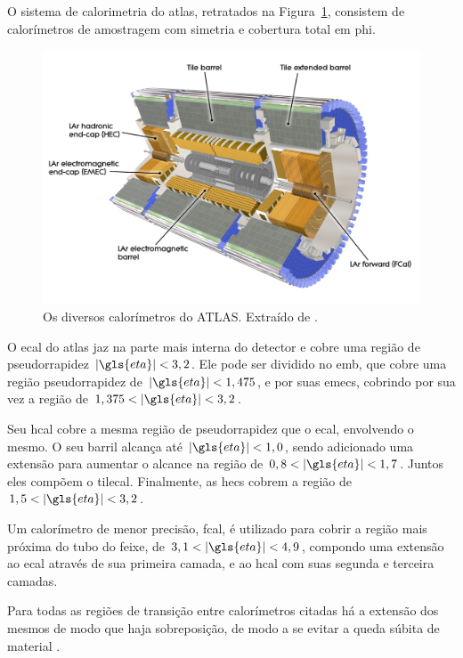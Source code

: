 O sistema de calorimetria \cite{cal_tdr,ecal_tdr,hcal_tdr} do \gls{atlas}, retratados na
Figura~\ref{fig:cal_atlas}, consistem de calorímetros de amostragem com 
simetria e cobertura total em \gls{phi}.

\begin{figure}[h!t]
\centering
\includegraphics[width=\textwidth]{imagens/calorimetros.pdf}
\caption[Os diversos subsistemas de calorimetria do ATLAS]{
Os diversos calorímetros do ATLAS. Extraído de
\cite{atlas_calorimeter_photo}.}
\label{fig:cal_atlas}
\end{figure}

O \gls{ecal} do \gls{atlas} jaz na parte mais interna do detector e cobre uma região de 
pseudorrapidez $|\gls{eta}|<3,2$. Ele pode ser dividido no
\gls{emb}, que cobre uma região pseudorrapidez de $|\gls{eta}|<1,475$, 
e por suas \glspl{emec}, cobrindo por sua vez a região de $1,375<|\gls{eta}|<3,2$.

Seu \gls{hcal} cobre a mesma região de pseudorrapidez que o \gls{ecal}, envolvendo
o mesmo. O seu barril alcança até $|\gls{eta}|<1,0$, sendo adicionado uma
extensão para aumentar o alcance na região de $0,8<|\gls{eta}|<1,7$. Juntos eles
compõem o \gls{tilecal}. Finalmente, as \glspl{hec} cobrem a região de $1,5<|\gls{eta}|<3,2$. 

Um calorímetro de menor precisão, \gls{fcal}, 
é utilizado para cobrir a região mais próxima do tubo do feixe, de
$3,1<|\gls{eta}|<4,9$, compondo uma extensão ao \gls{ecal} através de sua primeira camada,  
e ao \gls{hcal} com suas segunda e terceira camadas. 

Para todas as regiões de transição entre calorímetros citadas 
há a extensão dos mesmos de modo que haja sobreposição, 
de modo a se evitar a queda súbita de material \cite{paper_atlas}. 

